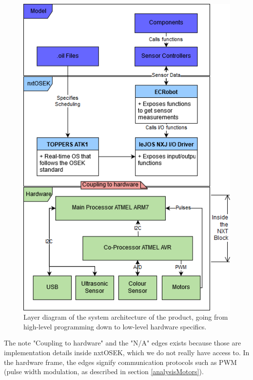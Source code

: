 \begin{figure}[H]
    \includegraphics[width=\textwidth]{Images/Design/abstractionLayerDiagram.png}
    \caption{Layer diagram of the system architecture of the product, going from high-level programming down to low-level hardware specifics.
    }
    \label{fig:abstractionLayers}
\end{figure}

The note "Coupling to hardware" and the "N/A" edges exists because those are implementation details inside nxtOSEK, which we do not really have access to. In the hardware frame, the edges signify communication protocols such as PWM (pulse width modulation, as described in section \ref{analysisMotors}). 
